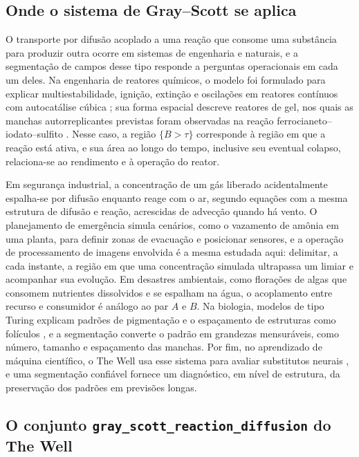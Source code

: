 \documentclass[12pt]{article}
\begin{document}
\subsection{Onde o sistema de Gray--Scott se aplica}
\label{subsec:aplicacoes}

O transporte por difusão acoplado a uma reação que consome uma substância para produzir outra ocorre em sistemas de engenharia e naturais, e a segmentação de campos desse tipo responde a perguntas operacionais em cada um deles. Na engenharia de reatores químicos, o modelo foi formulado para explicar multiestabilidade, ignição, extinção e oscilações em reatores contínuos com autocatálise cúbica \cite{gray1983,gray1984}; sua forma espacial descreve reatores de gel, nos quais as manchas autorreplicantes previstas foram observadas na reação ferrocianeto--iodato--sulfito \cite{lee1993}. Nesse caso, a região $\{B>\tau\}$ corresponde à região em que a reação está ativa, e sua área ao longo do tempo, inclusive seu eventual colapso, relaciona-se ao rendimento e à operação do reator.

Em segurança industrial, a concentração de um gás liberado acidentalmente espalha-se por difusão enquanto reage com o ar, segundo equações com a mesma estrutura de difusão e reação, acrescidas de advecção quando há vento. O planejamento de emergência simula cenários, como o vazamento de amônia em uma planta, para definir zonas de evacuação e posicionar sensores, e a operação de processamento de imagens envolvida é a mesma estudada aqui: delimitar, a cada instante, a região em que uma concentração simulada ultrapassa um limiar e acompanhar sua evolução. Em desastres ambientais, como florações de algas que consomem nutrientes dissolvidos e se espalham na água, o acoplamento entre recurso e consumidor é análogo ao par $A$ e $B$. Na biologia, modelos de tipo Turing explicam padrões de pigmentação e o espaçamento de estruturas como folículos \cite{kondo2010,murray2003}, e a segmentação converte o padrão em grandezas mensuráveis, como número, tamanho e espaçamento das manchas. Por fim, no aprendizado de máquina científico, o The Well usa esse sistema para avaliar substitutos neurais \cite{ohana2024well}, e uma segmentação confiável fornece um diagnóstico, em nível de estrutura, da preservação dos padrões em previsões longas.

\subsection{O conjunto \texttt{gray\_scott\_reaction\_diffusion} do The Well}
\label{subsec:dataset}
\end{document}

